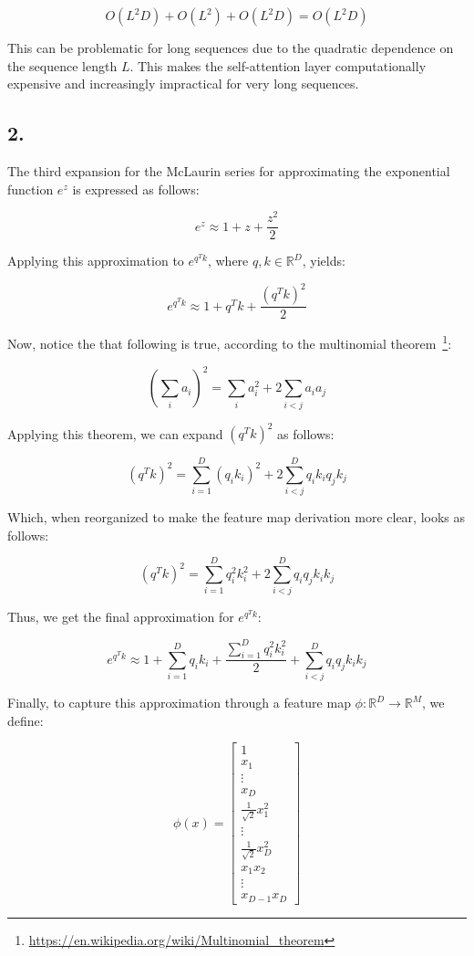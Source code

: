 \documentclass[11pt]{article}
\begin{document}
\[
    O(L^2D) + O(L^2) + O(L^2D) = O(L^2D)
\]

This can be problematic for long sequences due to the quadratic dependence on the sequence length \(L\). This makes the self-attention layer computationally expensive and increasingly impractical for very long sequences.

\subsection*{2.}

The third expansion for the McLaurin series for approximating the exponential function $e^z$ is expressed as follows:

\begin{equation}
    e^z \approx 1 + z + \frac{z^2}{2}
    \label{q1:2-mclaurin}
\end{equation}

Applying this approximation to \(e^{q^Tk}\), where \(q, k \in \mathbb{R}^D\), yields:

\[
    e^{q^Tk} \approx 1 + q^Tk + \frac{(q^Tk)^2}{2}
\]

Now, notice the that following is true, according to the multinomial theorem~\footnote{\url{https://en.wikipedia.org/wiki/Multinomial_theorem}}:

\[
    (\sum_{i}{a_i})^2 = \sum_{i}{a_i^2} + 2 \sum_{i < j}{a_ia_j}
\]

Applying this theorem, we can expand \((q^T k)^2\) as follows:

\[
    (q^Tk)^2 = \sum_{i=1}^{D}{(q_i k_i)}^2 + 2 \sum_{i < j}^{D}{q_i k_i q_j k_j}
\]

Which, when reorganized to make the feature map derivation more clear, looks as follows:

\[
    (q^Tk)^2 = \sum_{i=1}^{D}{q_i^2 k_i^2} + 2 \sum_{i < j}^{D}{q_i q_j k_i k_j}
\]

Thus, we get the final approximation for \(e^{q^Tk}\):

\[
    e^{q^Tk} \approx 1 + \sum_{i=1}^{D}{q_i k_i} + \frac{\sum_{i=1}^{D}{q_i^2 k_i^2}}{2} + \sum_{i < j}^{D}{q_i q_j k_i k_j}
\]

Finally, to capture this approximation through a feature map \(\phi: \mathbb{R}^D \rightarrow \mathbb{R}^M\), we define:

\[
    \phi(x) =
    \begin{bmatrix}
        1                       \\

        x_1                     \\
        \vdots                  \\
        x_D                     \\

        \frac{1}{\sqrt{2}}x_1^2 \\
        \vdots                  \\
        \frac{1}{\sqrt{2}}x_D^2 \\

        x_1x_2                  \\
        \vdots                  \\
        x_{D-1}x_D
    \end{bmatrix}
\]
\end{document}
